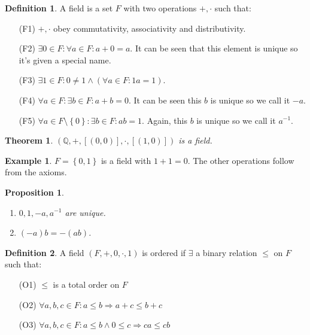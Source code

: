 \documentclass{article}
\newcommand\Q{\ensuremath{\mathbb{Q}}}
\newtheorem{theorem}{Theorem}[section]
\theoremstyle{definition}
\newtheorem{definition}{Definition}[subsection]
\newtheorem{eg}{Example}[subsection]
\theoremstyle{remark}
\theoremstyle{plain}
\newtheorem{prop}{Proposition}[subsection]
\begin{document}
\begin{definition}
    A field is a set \(F\) with two operations \(+,\cdot\) such that:
    \begin{enumerate}
        \item[(F1)] \(+,\cdot\) obey commutativity, associativity and distributivity. 
        \item[(F2)] \(\exists 0\in F: \forall a \in F: a + 0 = a\). It can be seen that this element is unique so it's given a special name. 
        \item[(F3)] \(\exists 1 \in F: 0\neq 1 \land (\forall a \in F: 1a = 1)\).
        \item[(F4)] \(\forall a \in F: \exists b \in F: a + b = 0\). It can be seen this \(b\) is unique so we call it \(-a\).
        \item[(F5)] \(\forall a \in F\setminus\left\{ 0 \right\}: \exists b \in F: ab = 1\). Again, this \(b\) is unique so we call it \(a^{-1}\).
    \end{enumerate}
\end{definition}

\begin{theorem}
    \((\Q, +, [(0,0)], \cdot, [(1,0)])\) is a field.
\end{theorem}

\begin{eg}
    \(F = \left\{ 0,1 \right\}\) is a field with \(1+1 = 0\). The other operations follow from
    the axioms.
\end{eg}

\begin{prop}
    \begin{enumerate}
        \item \(0,1,-a,a^{-1}\) are unique.
        \item \((-a)b = -(ab)\).
    \end{enumerate}
\end{prop}

\begin{definition}
    A field \((F, +, 0, \cdot, 1)\) is ordered if \(\exists\) a binary relation \(\leq \) on \(F\) such that:
    \begin{enumerate}
        \item[(O1)] \(\leq\) is a total order on \(F\)
        \item[(O2)] \(\forall a,b,c \in F: a\leq b \Rightarrow a + c \leq b + c\) 
        \item[(O3)] \(\forall a,b,c \in F: a\leq b \land 0 \leq c \Rightarrow ca \leq cb\)
    \end{enumerate}
\end{definition}
\end{document}
